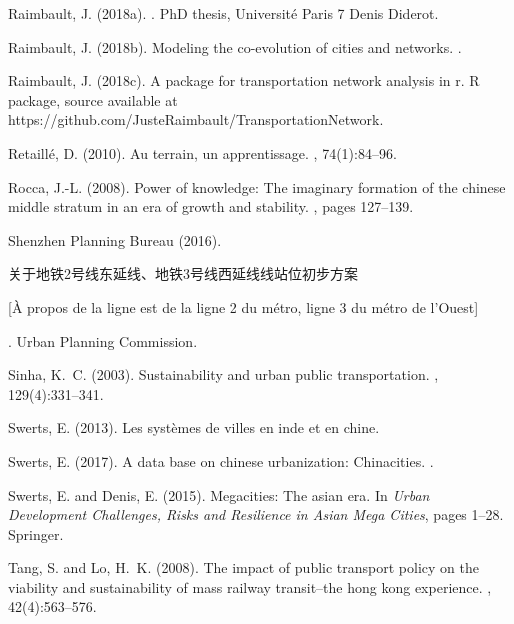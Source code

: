 \documentclass[11pt]{article}
\newcommand{\cn}[1]{
  \begin{CJK*}{UTF8}{gbsn}
  #1
  \end{CJK*}
}
\begin{document}
\begin{thebibliography}{}
Raimbault, J. (2018a).
.
\newblock PhD thesis, Universit{\'e} Paris 7 Denis Diderot.

Raimbault, J. (2018b).
\newblock Modeling the co-evolution of cities and networks.
.

Raimbault, J. (2018c).
\newblock A package for transportation network analysis in r.
\newblock R package, source available at
  https://github.com/JusteRaimbault/TransportationNetwork.

Retaill{\'e}, D. (2010).
\newblock Au terrain, un apprentissage.
, 74(1):84--96.

Rocca, J.-L. (2008).
\newblock Power of knowledge: The imaginary formation of the chinese middle
  stratum in an era of growth and stability.
, pages
  127--139.

{Shenzhen Planning Bureau} (2016).
\newblock
  {\cn{关于地铁2号线东延线、地铁3号线西延线线站位初步方案}
  [{\`A} propos de la ligne est de la ligne 2 du m{\'e}tro, ligne 3 du
  m{\'e}tro de l'Ouest]}.
\newblock Urban Planning Commission.

Sinha, K.~C. (2003).
\newblock Sustainability and urban public transportation.
, 129(4):331--341.

Swerts, E. (2013).
\newblock Les syst{\`e}mes de villes en inde et en chine.

Swerts, E. (2017).
\newblock A data base on chinese urbanization: Chinacities.
.

Swerts, E. and Denis, E. (2015).
\newblock Megacities: The asian era.
\newblock In {\em Urban Development Challenges, Risks and Resilience in Asian
  Mega Cities}, pages 1--28. Springer.

Tang, S. and Lo, H.~K. (2008).
\newblock The impact of public transport policy on the viability and
  sustainability of mass railway transit--the hong kong experience.
,
  42(4):563--576.


\end{thebibliography}
\end{document}
